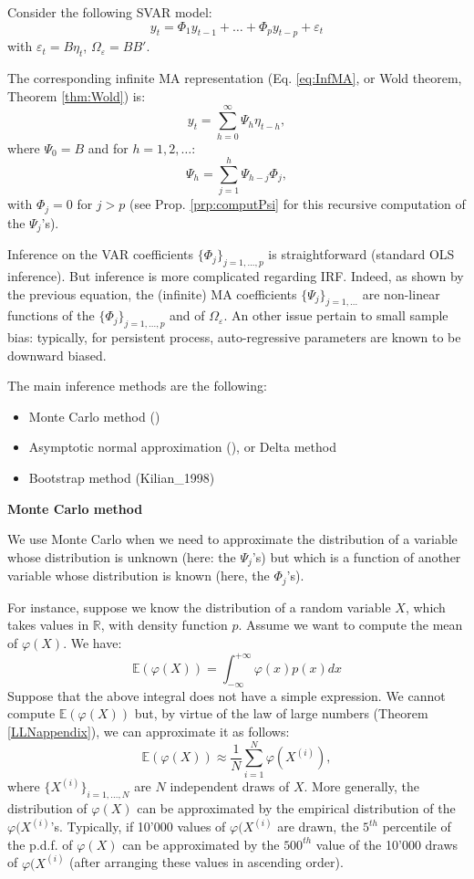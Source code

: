 \documentclass[
  12pt,
]{book}
\providecommand{\tightlist}{%
  \setlength{\itemsep}{0pt}\setlength{\parskip}{0pt}}
\theoremstyle{definition}
\theoremstyle{definition}
\theoremstyle{definition}
\theoremstyle{definition}
\theoremstyle{remark}
\begin{document}
Consider the following SVAR model:
\[y_t = \Phi_1 y_{t-1} + \dots + \Phi_p y_{t-p} + \varepsilon_t\]
with \(\varepsilon_t=B\eta_t\), \(\Omega_\varepsilon=BB'\).

The corresponding infinite MA representation (Eq. \eqref{eq:InfMA}, or Wold theorem, Theorem \ref{thm:Wold}) is:
\[
y_t = \sum_{h=0}^\infty\Psi_h \eta_{t-h},
\]
where \(\Psi_0=B\) and for \(h=1,2,\dots\):
\[
\Psi_h = \sum_{j=1}^h\Psi_{h-j}\Phi_j,
\]
with \(\Phi_j=0\) for \(j>p\) (see Prop. \ref{prp:computPsi} for this recursive computation of the \(\Psi_j\)'s).

Inference on the VAR coefficients \(\{\Phi_j\}_{j=1,...,p}\) is straightforward (standard OLS inference). But inference is more complicated regarding IRF. Indeed, as shown by the previous equation, the (infinite) MA coefficients \(\{\Psi_j\}_{j=1,...}\) are non-linear functions of the \(\{\Phi_j\}_{j=1,...,p}\) and of \(\Omega_\varepsilon\). An other issue pertain to small sample bias: typically, for persistent process, auto-regressive parameters are known to be downward biased.

The main inference methods are the following:

\begin{itemize}
\tightlist
\item
  Monte Carlo method (\citet{Hamilton_1994})
\item
  Asymptotic normal approximation (\citet{Lutkepohl_1990}), or Delta method
\item
  Bootstrap method (Kilian\_1998)
\end{itemize}

\textbf{Monte Carlo method}

We use Monte Carlo when we need to approximate the distribution of a variable whose distribution is unknown (here: the \(\Psi_j\)'s) but which is a function of another variable whose distribution is known (here, the \(\Phi_j\)'s).

For instance, suppose we know the distribution of a random variable \(X\), which takes values in \(\mathbb{R}\), with density function \(p\). Assume we want to compute the mean of \(\varphi(X)\). We have:
\[
\mathbb{E}(\varphi(X))=\int_{-\infty}^{+\infty}\varphi(x)p(x)dx
\]
Suppose that the above integral does not have a simple expression. We cannot compute \(\mathbb{E}(\varphi(X))\) but, by virtue of the law of large numbers (Theorem \ref{LLNappendix}), we can approximate it as follows:
\[
\mathbb{E}(\varphi(X))\approx\frac{1}{N}\sum_{i=1}^N\varphi(X^{(i)}),
\]
where \(\{X^{(i)}\}_{i=1,...,N}\) are \(N\) independent draws of \(X\). More generally, the distribution of \(\varphi(X)\) can be approximated by the empirical distribution of the \(\varphi(X^{(i)}\)'s. Typically, if 10'000 values of \(\varphi(X^{(i)}\) are drawn, the \(5^{th}\) percentile of the p.d.f. of \(\varphi(X)\) can be approximated by the \(500^{th}\) value of the 10'000 draws of \(\varphi(X^{(i)}\) (after arranging these values in ascending order).
\end{document}
